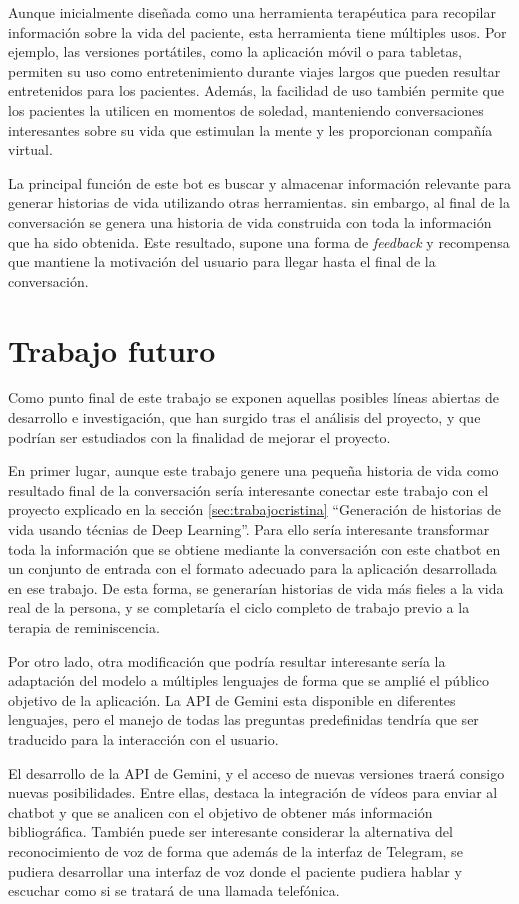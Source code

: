 Aunque inicialmente diseñada como una herramienta terapéutica para recopilar información sobre la vida del paciente, esta herramienta tiene múltiples usos. Por ejemplo, las versiones portátiles, como la aplicación móvil o para tabletas, permiten su uso como entretenimiento durante viajes largos que pueden resultar entretenidos para los pacientes. Además, la facilidad de uso también permite que los pacientes la utilicen en momentos de soledad, manteniendo conversaciones interesantes sobre su vida que estimulan la mente y les proporcionan compañía virtual.

La principal función de este bot es buscar y almacenar información relevante para generar historias de vida utilizando otras herramientas. sin embargo, al final de la conversación se genera una historia de vida construida con toda la información que ha sido obtenida. Este resultado, supone una forma de \textit{feedback} y recompensa que mantiene la motivación del usuario para llegar hasta el final de la conversación. 

\section{Trabajo futuro}

Como punto final de este trabajo se exponen aquellas posibles líneas abiertas de desarrollo e investigación, que han surgido tras el análisis del proyecto, y que podrían ser estudiados con la finalidad de mejorar el proyecto. 

En primer lugar, aunque este trabajo genere una pequeña historia de vida como resultado final de la conversación sería interesante conectar este trabajo con el proyecto explicado en la sección \ref{sec:trabajocristina} ``Generación de historias de vida usando técnias de Deep Learning''. Para ello sería interesante transformar toda la información que se obtiene mediante la conversación con este chatbot en un conjunto de entrada con el formato adecuado para la aplicación desarrollada en ese trabajo. De esta forma, se generarían historias de vida más fieles a la vida real de la persona, y se completaría el ciclo completo de trabajo previo a la terapia de reminiscencia. 

Por otro lado, otra modificación que podría resultar interesante sería la adaptación del modelo a múltiples lenguajes de forma que se amplié el público objetivo de la aplicación. La API de Gemini esta disponible en diferentes lenguajes, pero el manejo de todas las preguntas predefinidas tendría que ser traducido para la interacción con el usuario. 

El desarrollo de la API de Gemini, y el acceso de nuevas versiones traerá consigo nuevas posibilidades. Entre ellas, destaca la integración de vídeos para enviar al chatbot y que se analicen con el objetivo de obtener más información bibliográfica. También puede ser interesante considerar la alternativa del reconocimiento de voz de forma que además de la interfaz de Telegram, se pudiera desarrollar una interfaz de voz donde el paciente pudiera hablar y escuchar como si se tratará de una llamada telefónica.
